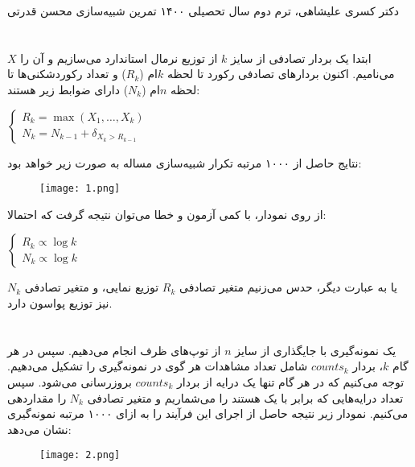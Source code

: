 \documentclass{scribe-cgenomics}
\begin{document}
{دکتر کسری علیشاهی، ترم دوم سال تحصیلی ۱۴۰۰}
{تمرین شبیه‌سازی}
{محسن قدرتی}

\newpage
\section{}
ابتدا یک بردار تصادفی از سایز
$k$
از توزیع نرمال استاندارد می‌سازیم و آن را
$X$
می‌نامیم. اکنون بردارهای تصادفی رکورد تا لحظه
$k$ام
($R_k$)
 و تعداد رکوردشکنی‌ها تا لحظه
$n$ام
($N_k$)
دارای ضوابط زیر هستند:

\begin{center}
$
\begin{cases}
R_k = \max (X_1, \dots, X_k) \\
N_k = N_{k-1} + \delta_{X_k > R_{k-1}}
\end{cases}
$
\end{center}

نتایج حاصل از ۱۰۰۰ مرتبه تکرار شبیه‌سازی مساله به صورت زیر خواهد بود:

\begin{figure}[h]\label{1}
\texttt{[image: 1.png]}
\centering
\end{figure}

از روی نمودار، با کمی آزمون و خطا می‌توان نتیجه گرفت که احتمالا:

\begin{center}
$
\begin{cases}
R_k \propto \log k \\
N_k \propto \log k
\end{cases}
$
\end{center}

یا به عبارت دیگر، حدس می‌زنیم متغیر تصادفی
$R_k$
توزیع نمایی، و متغیر تصادفی
$N_k$
نیز توزیع پواسون دارد.


\newpage
\section{}
یک نمونه‌گیری با جایگذاری از سایز
$n$
از توپ‌های ظرف انجام می‌دهیم. سپس در هر گام
$k$،
بردار
$counts_k$
شامل تعداد مشاهدات هر گوی در نمونه‌گیری را تشکیل می‌دهیم. توجه می‌کنیم که در هر گام تنها یک درایه از بردار
$counts_k$
بروزرسانی می‌شود. سپس تعداد درایه‌هایی که برابر با یک هستند را می‌شماریم و متغیر تصادفی
$N_k$
را مقدار‌دهی می‌کنیم.  نمودار زیر نتیجه حاصل از اجرای این فرآیند را به ازای ۱۰۰۰ مرتبه نمونه‌گیری نشان می‌دهد:

\begin{figure}[h]\label{2}
\texttt{[image: 2.png]}
\centering
\end{figure}
\end{document}
